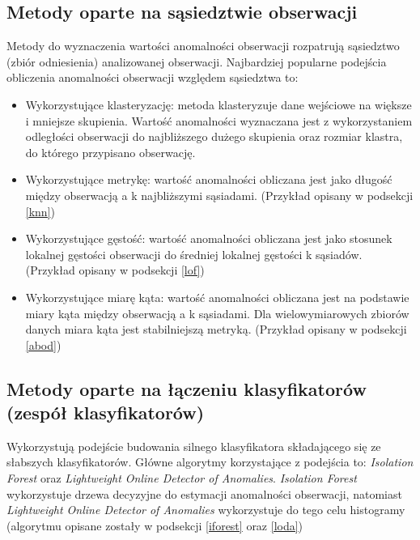     \subsection {Metody oparte na sąsiedztwie obserwacji}
Metody do wyznaczenia wartości anomalności obserwacji rozpatrują sąsiedztwo (zbiór odniesienia) analizowanej obserwacji. Najbardziej popularne podejścia obliczenia anomalności obserwacji względem sąsiedztwa to:
\begin{itemize}
    \item Wykorzystujące klasteryzację: metoda klasteryzuje dane wejściowe na większe i mniejsze skupienia. Wartość anomalności wyznaczana jest z wykorzystaniem odległości obserwacji do najbliższego dużego skupienia oraz rozmiar klastra, do którego przypisano obserwację.
    \item Wykorzystujące metrykę: wartość anomalności obliczana jest jako długość między obserwacją a k najbliższymi sąsiadami. (Przykład opisany w podsekcji \ref{knn})
    \item Wykorzystujące gęstość: wartość anomalności obliczana jest jako stosunek lokalnej gęstości obserwacji do średniej lokalnej gęstości k sąsiadów. (Przykład opisany w podsekcji \ref{lof})
    \item Wykorzystujące miarę kąta: wartość anomalności obliczana jest na podstawie miary kąta między obserwacją a k sąsiadami. Dla wielowymiarowych zbiorów danych miara kąta jest stabilniejszą metryką. (Przykład opisany w podsekcji \ref{abod})
\end{itemize}
\subsection {Metody oparte na łączeniu klasyfikatorów (zespół klasyfikatorów)}
Wykorzystują podejście budowania silnego klasyfikatora składającego się ze słabszych klasyfikatorów. Główne algorytmy korzystające z podejścia to: \textit{Isolation Forest} oraz \textit{Lightweight Online Detector of Anomalies}. \textit{Isolation Forest} wykorzystuje drzewa decyzyjne do estymacji anomalności obserwacji, natomiast \textit{Lightweight Online Detector of Anomalies} wykorzystuje do tego celu histogramy (algorytmu opisane zostały w podsekcji \ref{iforest} oraz \ref{loda})
